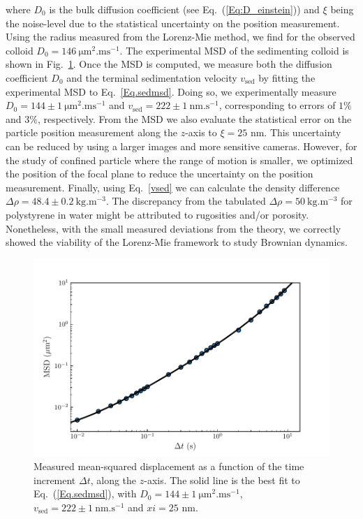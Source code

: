 where $D_0$ is the bulk diffusion coefficient (see Eq.~(\ref{Eq:D_einstein})) and $\xi$ being the noise-level due to the statistical uncertainty on the position measurement. Using the radius measured from the Lorenz-Mie method, we find for the observed colloid $D_0 = 146 ~\mathrm{\mu m ^2 . ms^{-1}}$. The experimental \gls{MSD} of the sedimenting colloid is shown in Fig.~\ref{fig:msdsed}. Once the \gls{MSD} is computed, we measure both the diffusion coefficient $D_0$ and the terminal sedimentation velocity $v_\mathrm{sed}$ by fitting the experimental \gls{MSD} to Eq.~\ref{Eq.sedmsd}. Doing so, we experimentally measure $D_0 = 144 \pm 1 ~ \mathrm{\mu m ^2 . ms^{-1}}$ and $v_\mathrm{sed} = 222 \pm 1 ~ \mathrm{nm.s^{-1}}$, corresponding to errors of $1\%$ and $3\%$, respectively. From the MSD we also evaluate the statistical error on the particle position measurement along the $z$-axis to $\xi = 25$ nm. This uncertainty can be reduced by using a larger images and more sensitive cameras. However, for the study of confined particle where the range of motion is smaller, we optimized the position of the focal plane to reduce the uncertainty on the position measurement. Finally, using Eq.~\ref{vsed} we can calculate the density difference $\Delta \rho = 48.4 \pm 0.2~ \mathrm{kg.m^{-3}}$. The discrepancy from the tabulated $\Delta \rho = 50~ \mathrm{kg.m^{-3}}$ for polystyrene in water might be attributed to rugosities and/or porosity. Nonetheless, with the small measured deviations from the theory, we correctly showed the viability of the Lorenz-Mie framework to study Brownian dynamics.  

\begin{figure}[H]
	\centering
	\includegraphics{02_body/chapter2/images/sedimenting/msd_sedimentation.pdf}
	\caption{Measured mean-squared displacement as a function of the time increment $\Delta t$, along the $z$-axis. The solid line is the best fit to Eq.~(\ref{Eq.sedmsd}), with $D_0 = 144 \pm 1 ~ \mathrm{\mu m ^2 . ms^{-1}}$, $v_\mathrm{sed} = 222 \pm 1 ~ \mathrm{nm.s^{-1}}$ and $xi = 25 $ nm.}
	\label{fig:msdsed}
\end{figure}



